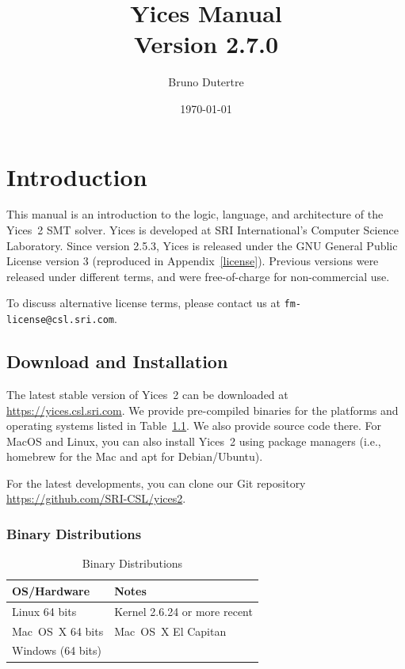\documentclass[11pt,twoside,fleqn,openright,titlepage]{cslreport}
\begin{document}
\begin{titlepage}
\date{\today}
\author{Bruno Dutertre}
\title{\textbf{Yices Manual\\[0.6em]
Version 2.7.0}}
\end{titlepage}

\maketitle
\cleardoublepageblank
\tableofcontents
\cleardoublepage
\setcounter{page}{0}


\chapter{Introduction}

This  manual   is  an  introduction   to  the  logic,   language,  and
architecture  of the Yices~2 SMT  solver. Yices  is developed  at SRI
International's  Computer Science  Laboratory.   Since version  2.5.3,
Yices  is released  under the  GNU  General Public  License version  3
(reproduced  in   Appendix~\ref{license}).   Previous   versions  were
released   under  different   terms,  and   were  free-of-charge   for
non-commercial use.

\medskip\noindent
To discuss alternative license terms, please contact us at
\texttt{fm-license@csl.sri.com}.


\section{Download and Installation}

The latest stable version of Yices~2 can be downloaded at
\url{https://yices.csl.sri.com}.  We provide pre-compiled binaries for
the platforms and operating systems listed in Table~\ref{versions}. We
also provide source code there. For MacOS and Linux, you can also
install Yices~2 using package managers (i.e., homebrew for the Mac and
apt for Debian/Ubuntu).

\medskip\noindent
For the latest developments, you can clone our Git repository
\url{https://github.com/SRI-CSL/yices2}.


\subsection{Binary Distributions}

\begin{table}
\begin{center}
\renewcommand{\arraystretch}{1.1}
\begin{tabular}{|l|l|}
\hline
\textbf{OS/Hardware} & \textbf{Notes} \\
\hline
\hline
Linux 64 bits & Kernel 2.6.24 or more recent \\
\hline
Mac~OS~X 64 bits &  Mac~OS~X El Capitan\\
\hline
Windows (64 bits) & \\
\hline
\end{tabular}
\end{center}
\caption{Binary Distributions}
\label{versions}
\end{table}
\end{document}
